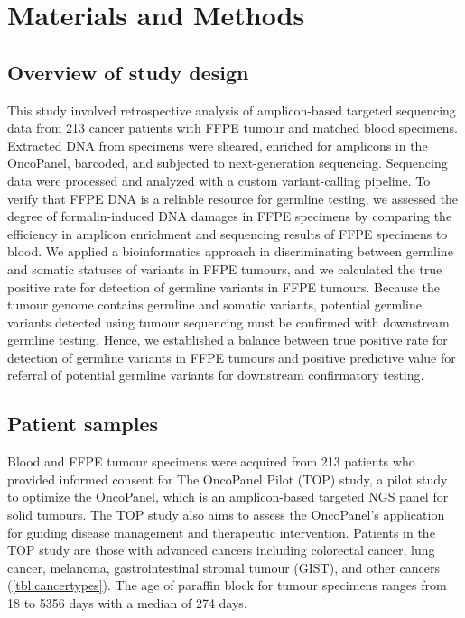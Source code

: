 
\chapter{Materials and Methods}
\label{ch:Materialsandmethods}

\section{Overview of study design}
\label{sec:Overviewofstudydesign}

This study involved retrospective analysis of amplicon-based targeted sequencing data from 213 cancer patients with FFPE tumour and matched blood specimens. Extracted DNA from specimens were sheared, enriched for amplicons in the OncoPanel, barcoded, and subjected to next-generation sequencing. Sequencing data were processed and analyzed with a custom variant-calling pipeline. To verify that FFPE DNA is a reliable resource for germline testing, we assessed the degree of formalin-induced DNA damages in FFPE specimens by comparing the efficiency in amplicon enrichment and sequencing results of FFPE specimens to blood. We applied a bioinformatics approach in discriminating between germline and somatic statuses of variants in FFPE tumours, and we calculated the true positive rate for detection of germline variants in FFPE tumours. Because the tumour genome contains germline and somatic variants, potential germline variants detected using tumour sequencing must be confirmed with downstream germline testing. Hence, we established a balance between true positive rate for detection of germline variants in FFPE tumours and positive predictive value for referral of potential germline variants for downstream confirmatory testing.

\section{Patient samples}
\label{sec:Patientsamples}

Blood and FFPE tumour specimens were acquired from 213 patients who provided informed consent for The OncoPanel Pilot (TOP) study, a pilot study to optimize the OncoPanel, which is an amplicon-based targeted NGS panel for solid tumours. The TOP study also aims to assess the OncoPanel's application for guiding disease management and therapeutic intervention. Patients in the TOP study are those with advanced cancers including colorectal cancer, lung cancer, melanoma, gastrointestinal stromal tumour (GIST), and other cancers (\autoref{tbl:cancertypes}). The age of paraffin block for tumour specimens ranges from 18 to 5356 days with a median of 274 days.

